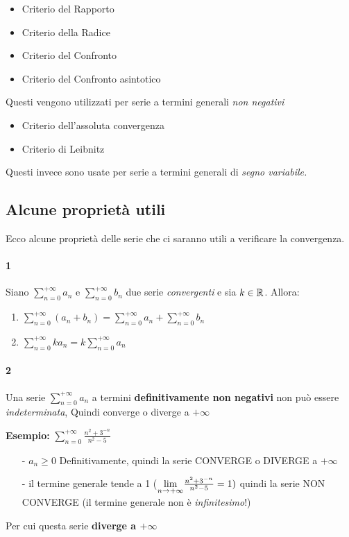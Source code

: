 \documentclass[12pt, a4paper, openany]{book}
\newcommand{\esempio}[1]{\begin{box_esempio} \textbf{Esempio: }#1\end{box_esempio}}
\begin{document}
\begin{itemize}
    \item Criterio del Rapporto
    \item Criterio della Radice
    \item Criterio del Confronto
    \item Criterio del Confronto asintotico
\end{itemize}
Questi vengono utilizzati per serie a termini generali \emph{non negativi}
\begin{itemize}
    \item Criterio dell'assoluta convergenza
    \item Criterio di Leibnitz
\end{itemize}
Questi invece sono usate per serie a termini generali di \emph{segno variabile.}

\subsection{Alcune proprietà utili}
Ecco alcune proprietà delle serie che ci saranno utili a verificare la convergenza.

\paragraph*{1}Siano $\sum_{n=0}^{+\infty}a_n$ e $\sum_{n=0}^{+\infty}b_n$ due serie \emph{convergenti} e sia $k\in\mathbb{R}$.
Allora:
\begin{enumerate}
    \item $\sum_{n=0}^{+\infty}(a_n + b_n) = \sum_{n=0}^{+\infty}a_n + \sum_{n=0}^{+\infty}b_n$
    \item $\sum_{n=0}^{+\infty} k a_n = k \sum_{n=0}^{+\infty}a_n$
\end{enumerate}

\paragraph*{2} Una serie $\sum_{n=0}^{+\infty}a_n$ a termini \textbf{definitivamente non negativi} non può essere \emph{indeterminata},
Quindi converge o diverge a $+\infty$
\esempio{
    $\sum_{n=0}^{+\infty}\frac{n^2+3^{-n}}{n^2-5}$
    \begin{itemize}
        \item[-] $a_n \geq 0$ Definitivamente, quindi la serie CONVERGE o DIVERGE a $+\infty$
        \item[-] il termine generale tende a 1 ($\underset{n \to +\infty}{\lim} \frac{n^2+3^{-n}}{n^2-5} = 1)$ quindi la serie NON CONVERGE (il termine generale non è \emph{infinitesimo}!)  
    \end{itemize}
    Per cui questa serie \textbf{diverge a $+\infty$}
}
\end{document}

